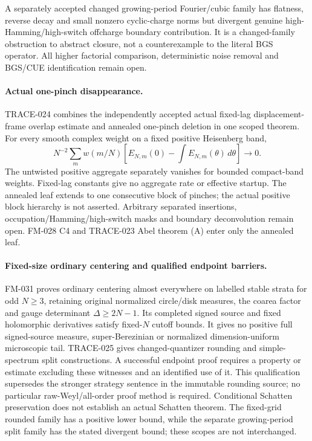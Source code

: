 A separately accepted changed growing-period Fourier/cubic family has
flatness, reverse decay and small nonzero cyclic-charge norms but divergent
genuine high-Hamming/high-switch offcharge boundary contribution. It is a
changed-family obstruction to abstract closure, not a counterexample to
the literal BGS operator. All higher factorial comparison, deterministic
noise removal and BGS/CUE identification remain open.

\paragraph{Actual one-pinch disappearance.}
TRACE-024 combines the independently accepted actual fixed-lag
 displacement-frame overlap estimate and annealed one-pinch deletion in one
scoped theorem. For every smooth complex weight on a fixed positive
Heisenberg band,
\[
 N^{-2}\sum_m w(m/N)
 \left[E_{N,m}(0)-\int E_{N,m}(\theta)\,d\theta\right]\longrightarrow0.
\]
The untwisted positive aggregate separately vanishes for bounded compact-band
weights. Fixed-lag constants give no aggregate rate or effective startup.
The annealed leaf extends to one consecutive block of pinches; the actual
positive block hierarchy is not asserted. Arbitrary separated insertions,
occupation/Hamming/high-switch masks and boundary deconvolution remain open.
FM-028 C4 and TRACE-023 Abel theorem (A) enter only the annealed leaf.

\paragraph{Fixed-size ordinary centering and qualified endpoint barriers.}
FM-031 proves ordinary centering almost everywhere on labelled stable strata
for odd $N\ge3$, retaining original normalized circle/disk measures, the
coarea factor and gauge determinant $\Delta\ge2N-1$. Its completed signed
source and fixed holomorphic derivatives satisfy fixed-$N$ cutoff bounds.
It gives no positive full signed-source measure, super-Berezinian or
normalized dimension-uniform microscopic tail.
TRACE-025 gives changed-quantizer rounding and simple-spectrum split
constructions. A successful endpoint proof requires a property or estimate
excluding these witnesses and an identified use of it. This qualification
supersedes the stronger strategy sentence in the immutable rounding source;
no particular raw-Weyl/all-order proof method is required. Conditional
Schatten preservation does not establish an actual Schatten theorem.
The fixed-grid rounded family has a positive lower bound, while the separate
growing-period split family has the stated divergent bound; these scopes
are not interchanged.

